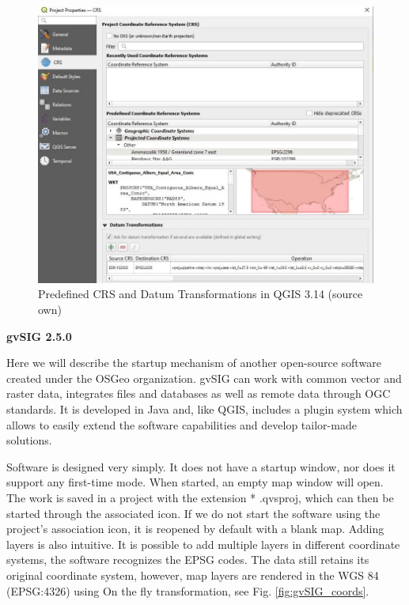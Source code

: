 \documentclass[a4paper,10pt,twoside]{article}
\begin{document}
\begin{figure}[hbt!] 
\begin{center}
\includegraphics[width=14cm]{../pictures/qgis_trans.JPG} 
\caption[Predefined CRS and Datum Transformations in QGIS 3.14 (source own)]{Predefined CRS and Datum Transformations in QGIS 3.14 (source own)}
\label{fig:qgis_trans}
\end{center}
\end{figure}


\newpage
\vspace*{-1cm} 
\bigskip

\noindent \textbf {gvSIG 2.5.0}

\noindent Here we will describe the startup mechanism of another open-source software created under the OSGeo organization. gvSIG can work with common vector and raster data, integrates files and databases as well as remote data through OGC standards. It is developed in Java and, like QGIS, includes a plugin system which allows to easily extend the software capabilities and develop tailor-made solutions.

Software is designed very simply. It does not have a startup window, nor does it support any first-time mode. When started, an empty map window will open. The work is saved in a project with the extension * .qvsproj, which can then be started through the associated icon. If we do not start the software using the project's association icon, it is reopened by default with a blank map. Adding layers is also intuitive. It is possible to add multiple layers in different coordinate systems, the software recognizes the EPSG codes. The data still retains its original coordinate system, however, map layers are rendered in the WGS 84 (EPSG:4326) using On the fly transformation, see Fig. \ref{fig:gvSIG_coords}.
\end{document}
